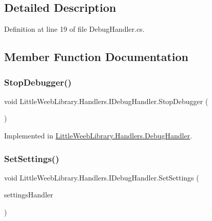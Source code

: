 \subsection{Detailed Description}


Definition at line 19 of file Debug\+Handler.\+cs.



\subsection{Member Function Documentation}
\mbox{\label{interface_little_weeb_library_1_1_handlers_1_1_i_debug_handler_a96c2102206eb5238faa8a07bc9652fd1}} 
\subsubsection{\texorpdfstring{Stop\+Debugger()}{StopDebugger()}}
{\footnotesize\ttfamily void Little\+Weeb\+Library.\+Handlers.\+I\+Debug\+Handler.\+Stop\+Debugger (\begin{DoxyParamCaption}{ }\end{DoxyParamCaption})}



Implemented in \mbox{\hyperlink{class_little_weeb_library_1_1_handlers_1_1_debug_handler_aa02d002a4bdac52d769697d240866214}{Little\+Weeb\+Library.\+Handlers.\+Debug\+Handler}}.

\mbox{\label{interface_little_weeb_library_1_1_handlers_1_1_i_debug_handler_ac94e404b87a0922e0d6a7c7a7bc2a1b5}} 
\subsubsection{\texorpdfstring{Set\+Settings()}{SetSettings()}}
{\footnotesize\ttfamily void Little\+Weeb\+Library.\+Handlers.\+I\+Debug\+Handler.\+Set\+Settings (\begin{DoxyParamCaption}\item[{\mbox{\hyperlink{interface_little_weeb_library_1_1_handlers_1_1_i_settings_handler}{I\+Settings\+Handler}}}]{settings\+Handler }\end{DoxyParamCaption})}




